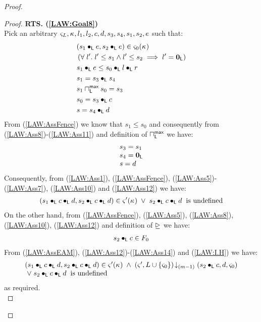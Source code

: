 \begin{lemma}[]
\begin{proof}
\begin{proof}
\noindent\textbf{RTS. (\ref{LAW:Goal8})} \\
Pick an arbitrary $\varsigma_{L}, \kappa_{}, l_1, l_2, c, d, s_3, s_4, s_1, s_2, e$ such that:
%
\begin{align}
	& (s_1 \bullet_{\textsf{L}} e, s_2 \bullet_{\textsf{L}} e) \in \varsigma_{0}(\kappa_{}) \label{LAW:Ass5} \\
	& \left(\forall\; l'.\; l' \leq s_1 \land l' \leq s_2 \implies l' = \mathbf{0}_{\textsf{L}}\right) \label{LAW:Ass6}\\
	& s_1 \bullet_{\textsf{L}} e \leq  s_0 \bullet_{\textsf{L}} l \bullet_{\textsf{L}} r \label{LAW:Ass7}\\
	& s_1 = s_3 \bullet_{\textsf{L}} s_4 \label{LAW:Ass8}\\
	& s_1 \sqcap_{\textsf{L}}^{\textsf{max}} s_0 = s_3 \label{LAW:Ass9}\\
	& s_0 = s_3 \bullet_{\textsf{L}} c \label{LAW:Ass10}\\
	& s= s_4 \bullet_{\textsf{L}} d \label{LAW:Ass11}
\end{align}
From (\ref{LAW:AssFence}) we know that $s_1 \leq s_0$ and consequently from (\ref{LAW:Ass8})-(\ref{LAW:Ass11}) and definition of $\sqcap_{\textsf{L}}^{\textsf{max}}$ we have:
%
\begin{align}
\begin{array}{l}
	s_3 = s_1 \\
	s_4 = \mathbf{0}_{\textsf{L}}\\
	s = d
\end{array} \label{LAW:Ass12}
\end{align}
Consequently, from (\ref{LAW:Ass1}), (\ref{LAW:AssFence}), (\ref{LAW:Ass5})-(\ref{LAW:Ass7}), (\ref{LAW:Ass10}) and (\ref{LAW:Ass12}) we have:
%
\begin{align}
	(s_1 \bullet_{\textsf{L}} c \bullet_{\textsf{L}} d, s_2 \bullet_{\textsf{L}} c \bullet_{\textsf{L}} d) \in \varsigma_{}'(\kappa_{}) \;\lor\; s_2 \bullet_{\textsf{L}} c \bullet_{\textsf{L}} d \hspace*{0.2cm} \text{is undefined} \label{LAW:Ass13}
\end{align}
%
On the other hand, from (\ref{LAW:AssFence}), (\ref{LAW:Ass5}), (\ref{LAW:Ass8}), (\ref{LAW:Ass10}), (\ref{LAW:Ass12}) and definition of $\unrhd$ we have:
%
\begin{align}
	s_2 \bullet_{\textsf{L}} c \in F_0 \label{LAW:Ass14}
\end{align}
%
From (\ref{LAW:AssEAM}), (\ref{LAW:Ass12})-(\ref{LAW:Ass14}) and (\ref{LAW:I.H}) we have:
%
%
\begin{align}
\begin{array}{l}
	(s_1 \bullet_{\textsf{L}} c \bullet_{\textsf{L}} d, s_2 \bullet_{\textsf{L}} c \bullet_{\textsf{L}} d) \in \varsigma_{}'(\kappa_{}) \;\land\; \left(\varsigma_{}', L \cup \{\varsigma_{0}\}\right) \!\downarrow_{(m-1)} \left(s_2 \bullet_{\textsf{L}} c, d, \varsigma_{0}\right)\\
	\;\lor\; s_2 \bullet_{\textsf{L}} c \bullet_{\textsf{L}} d \hspace*{0.2cm} \text{is undefined}
\end{array} \nonumber
\end{align}
as required.\\


\end{proof}
\end{proof}
\end{lemma}
